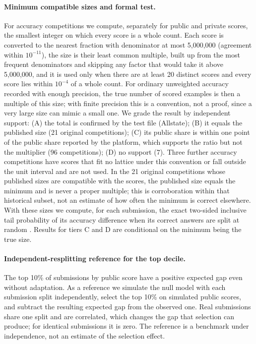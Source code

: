 \documentclass[10pt]{article}
\begin{document}
\paragraph{Minimum compatible sizes and formal test.} For accuracy competitions we compute, separately for public and private scores, the smallest integer on which every score is a whole count. Each score is converted to the nearest fraction with denominator at most 5,000,000 (agreement within $10^{-11}$), the size is their least common multiple, built up from the most frequent denominators and skipping any factor that would take it above 5,000,000, and it is used only when there are at least 20 distinct scores and every score lies within $10^{-4}$ of a whole count. For ordinary unweighted accuracy recorded with enough precision, the true number of scored examples is then a multiple of this size; with finite precision this is a convention, not a proof, since a very large size can mimic a small one. We grade the result by independent support: (A) the total is confirmed by the test file (Allstate); (B) it equals the published size (21 original competitions); (C) its public share is within one point of the public share reported by the platform, which supports the ratio but not the multiplier (96 competitions); (D) no support (7). Three further accuracy competitions have scores that fit no lattice under this convention or fall outside the unit interval and are not used. In the 21 original competitions whose published sizes are compatible with the scores, the published size equals the minimum and is never a proper multiple; this is corroboration within that historical subset, not an estimate of how often the minimum is correct elsewhere. With these sizes we compute, for each submission, the exact two-sided inclusive tail probability of its accuracy difference when its correct answers are split at random \citep{roelofs2019meta}. Results for tiers C and D are conditional on the minimum being the true size.

\paragraph{Independent-resplitting reference for the top decile.} The top 10\% of submissions by public score have a positive expected gap even without adaptation. As a reference we simulate the null model with each submission split independently, select the top 10\% on simulated public scores, and subtract the resulting expected gap from the observed one. Real submissions share one split and are correlated, which changes the gap that selection can produce; for identical submissions it is zero. The reference is a benchmark under independence, not an estimate of the selection effect.
\end{document}
